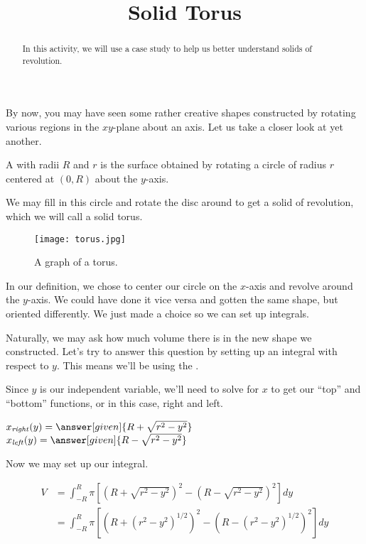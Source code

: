 \documentclass{ximera}
\title{Solid Torus}
\begin{document}
\begin{abstract}
In this activity, we will use a case study to help us better understand solids of revolution.
\end{abstract}
\maketitle

By now, you may have seen some rather creative shapes constructed by rotating various regions in the $xy$-plane about an axis. Let us take a closer look at yet another.
\begin{definition}
	A  with radii $R$ and $r$ is the surface obtained by rotating a circle of radius $r$ centered at $(0,R)$ about the $y$-axis.
\end{definition}
We may fill in this circle and rotate the disc around to get a solid of revolution, which we will call a solid torus.
\begin{figure}
	\label{torus}
	\texttt{[image: torus.jpg]}
	\caption{A graph of a torus.}
\end{figure}

\begin{remark}
	In our definition, we chose to center our circle on the $x$-axis and revolve around the $y$-axis. We could have done it vice versa and gotten the same shape, but oriented differently. We just made a choice so we can set up integrals.
\end{remark} 

\begin{exercise}
	Naturally, we may ask how much volume there is in the new shape we constructed. Let's try to answer this question by setting up an integral with respect to $y$. This means we'll be using the  .
	
	Since $y$ is our independent variable, we'll need to solve for $x$ to get our ``top'' and ``bottom'' functions, or in this case, right and left.
	
	$x_{\mathit{right}}(y) = \answer[given]{R+\sqrt{r^2-y^2}}$
	$x_{\mathit{left}}(y) = \answer[given]{R-\sqrt{r^2-y^2}}$
	
	Now we may set up our integral.
	
	\begin{align*}
		V  &= \int_{-R}^{R} \pi [ (R+\sqrt{r^2-y^2})^{2}-(R-\sqrt{r^2-y^2})^{2}] dy \\
		&= \int_{-R}^{R} \pi [ (R+(r^2-y^2)^{1/2})^{2}-(R-(r^2-y^2)^{1/2})^{2}] dy
	\end{align*}


\end{exercise}
\end{document}
